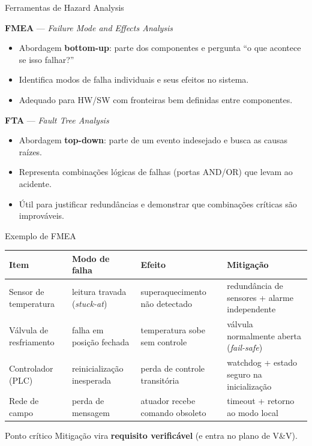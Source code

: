 \documentclass{beamer}
\begin{document}
\begin{frame}{Ferramentas de Hazard Analysis}

\textbf{FMEA} — \textit{Failure Mode and Effects Analysis}
\begin{itemize}
  \item Abordagem \textbf{bottom-up}: parte dos componentes e pergunta ``o que acontece se isso falhar?''
  \item Identifica modos de falha individuais e seus efeitos no sistema.
  \item Adequado para HW/SW com fronteiras bem definidas entre componentes.
\end{itemize}

\vspace{0.6em}

\textbf{FTA} — \textit{Fault Tree Analysis}
\begin{itemize}
  \item Abordagem \textbf{top-down}: parte de um evento indesejado e busca as causas raízes.
  \item Representa combinações lógicas de falhas (portas AND/OR) que levam ao acidente.
  \item Útil para justificar redundâncias e demonstrar que combinações críticas são improváveis.
\end{itemize}

\end{frame}

\begin{frame}{Exemplo de FMEA}
\footnotesize
\begin{tabular}{p{2.0cm} p{2.8cm} p{2.8cm} p{2.8cm}}
\toprule
\textbf{Item} & \textbf{Modo de falha} & \textbf{Efeito} & \textbf{Mitigação}\\
\midrule
Sensor de temperatura & leitura travada (\textit{stuck-at}) & superaquecimento não detectado & redundância de sensores + alarme independente\\
Válvula de resfriamento & falha em posição fechada & temperatura sobe sem controle & válvula normalmente aberta (\textit{fail-safe})\\
Controlador (PLC) & reinicialização inesperada & perda de controle transitória & watchdog + estado seguro na inicialização\\
Rede de campo & perda de mensagem & atuador recebe comando obsoleto & timeout + retorno ao modo local\\
\bottomrule
\end{tabular}

\vspace{0.4em}
\begin{block}{Ponto crítico}
Mitigação vira \textbf{requisito verificável} (e entra no plano de V\&V).
\end{block}
\end{frame}
\end{document}
